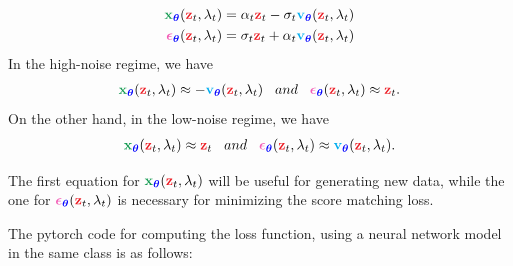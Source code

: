 \documentclass[usenames,dvipsnames]{article}
\newcommand{\myvec}[1]{\mathbf{#1}}
\newcommand{\myvecsym}[1]{\boldsymbol{#1}}
\newcommand{\vx}{\myvec{\textcolor{ForestGreen}{x}}}
\newcommand{\vz}{\myvec{\textcolor{Red}{z}}}
\newcommand{\vv}{\myvec{\textcolor{Cyan}{v}}}
\newcommand{\vtheta}{\myvecsym{\textcolor{blue}{\theta}}}
\newcommand{\vepsilon}{\myvecsym{\textcolor{CarnationPink}{\epsilon}}}
\begin{document}
\begin{align}
\vx_{\vtheta}(\vz_t,\lambda_t) &=  \alpha_t \vz_t - \sigma_t \vv_{\vtheta}(\vz_t,\lambda_t)
\\
\vepsilon_{\vtheta}(\vz_t,\lambda_t) &=  \sigma_t \vz_t + \alpha_t \vv_{\vtheta}(\vz_t,\lambda_t)
\end{align}
In the high-noise regime, we have
\begin{align}
\vx_{\vtheta}(\vz_t,\lambda_t) \approx -  \vv_{\vtheta}(\vz_t,\lambda_t) \hspace{.3cm} and \hspace{.3cm} \vepsilon_{\vtheta}(\vz_t,\lambda_t) \approx \vz_t.
\end{align}
On the other hand, in the low-noise regime, we have
\begin{align}
\vx_{\vtheta}(\vz_t,\lambda_t) \approx \vz_t  \hspace{.3cm} and \hspace{.3cm} \vepsilon_{\vtheta}(\vz_t,\lambda_t) \approx \vv_{\vtheta}(\vz_t,\lambda_t).
\end{align}

The first equation for $\vx_{\vtheta}(\vz_t,\lambda_t)$ will be useful for generating new data, while the one for $\vepsilon_{\vtheta}(\vz_t,\lambda_t)$ is necessary for minimizing the score matching loss.

The pytorch code for computing the loss function, using a neural network model in the same class is as follows:
\end{document}
